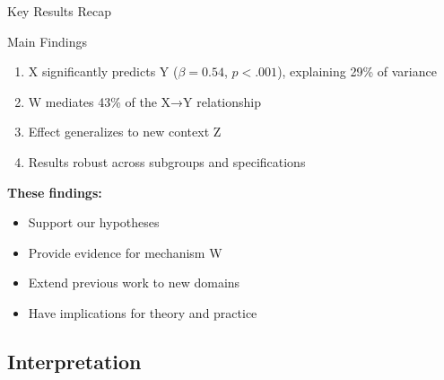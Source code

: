 \documentclass[aspectratio=169,11pt]{beamer}
\begin{document}
\begin{frame}{Key Results Recap}
  \begin{exampleblock}{Main Findings}
    \begin{enumerate}
      \item X significantly predicts Y ($\beta = 0.54$, $p < .001$), explaining 29\% of variance
      \item W mediates 43\% of the X→Y relationship
      \item Effect generalizes to new context Z
      \item Results robust across subgroups and specifications
    \end{enumerate}
  \end{exampleblock}
  
  \vspace{0.5cm}
  
  \textbf{These findings:}
  \begin{itemize}
    \item Support our hypotheses
    \item Provide evidence for mechanism W
    \item Extend previous work to new domains
    \item Have implications for theory and practice
  \end{itemize}
\end{frame}

\subsection{Interpretation}
\end{document}
